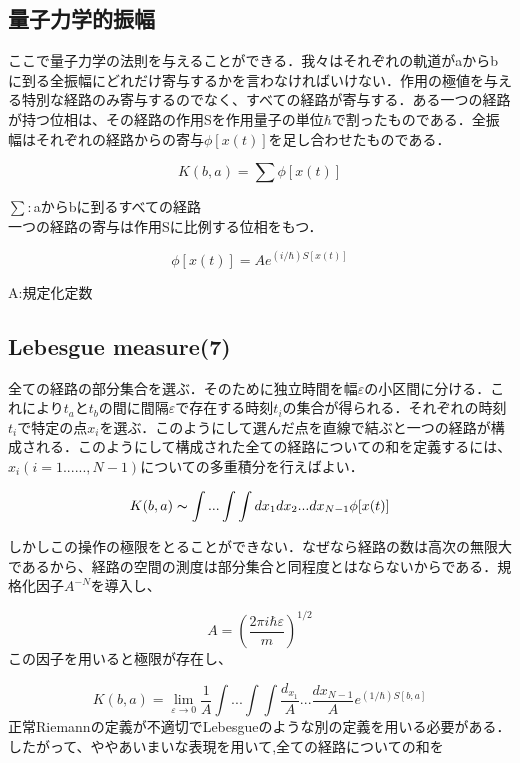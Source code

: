 \documentclass[xelatex,ja=standard,jafont=noto]{bxjsarticle}
\begin{document}
\subsection{量子力学的振幅}
ここで量子力学の法則を与えることができる．我々はそれぞれの軌道がaからbに到る全振幅にどれだけ寄与するかを言わなければいけない．作用の極値を与える特別な経路のみ寄与するのでなく、すべての経路が寄与する．ある一つの経路が持つ位相は、その経路の作用Sを作用量子の単位$\hbar$で割ったものである．全振幅はそれぞれの経路からの寄与$\phi[x(t)]$を足し合わせたものである．

\begin{equation}
    K(b,a)=\sum\phi[x(t)]
\end{equation}

$\sum:$aからbに到るすべての経路\\

一つの経路の寄与は作用Sに比例する位相をもつ．

\begin{equation}
    \phi[x(t)]=Ae^{(i/\hbar)S[x(t)]}
\end{equation}

A:規定化定数

\subsection{Lebesgue measure(7)}
全ての経路の部分集合を選ぶ．そのために独立時間を幅$\varepsilon$の小区間に分ける．これにより$t_{a}$と$t_{b}$の間に間隔$\varepsilon$で存在する時刻$t_{i}$の集合が得られる．それぞれの時刻$t_{i}$で特定の点$x_{i}$を選ぶ．このようにして選んだ点を直線で結ぶと一つの経路が構成される．このようにして構成された全ての経路についての和を定義するには、$x_{i}(i=1......,N-1)$についての多重積分を行えばよい．


\begin{equation}
    K(b,a)\thicksim\int...\int\int dx_{1}dx_{2}...dx_{N-1}\phi[x(t)]
\end{equation}


しかしこの操作の極限をとることができない．なぜなら経路の数は高次の無限大であるから、経路の空間の測度は部分集合と同程度とはならないからである．規格化因子$A^{-N}$を導入し、

\begin{equation}
    A=(\frac{2\pi i\hbar\varepsilon}{m})^{1/2}
\end{equation}
この因子を用いると極限が存在し、

\begin{equation}
     K(b,a)=\lim_{\varepsilon\to 0}\frac{1}{A}\int...\int\int \frac{d_{x_{1}}}{A}...\frac{dx_{N-1}}{A}e^{(1/\hbar)S[b,a]}
\end{equation}
正常Riemannの定義が不適切でLebesgueのような別の定義を用いる必要がある．したがって、ややあいまいな表現を用いて,全ての経路についての和を
\end{document}
